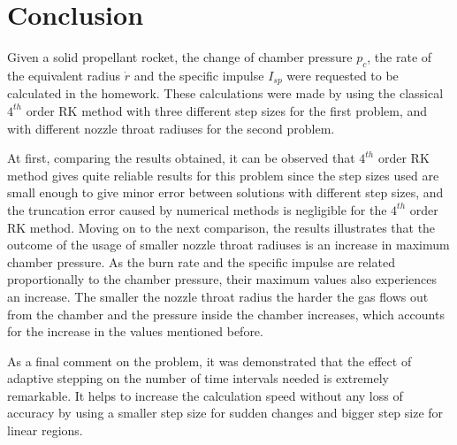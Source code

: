 \documentclass[letterpaper,12pt]{article}
\begin{document}
\newpage

\section{Conclusion}

Given a solid propellant rocket, the change of chamber pressure $p_c$,
the rate of the equivalent radius $\dot{r}$ and the specific impulse $I_{sp}$ were
requested to be calculated in the homework. These calculations were
made by using the classical $4^{th}$ order RK method with three different step sizes for the first
problem, and with different nozzle throat radiuses for the second problem.

At first, comparing the results obtained, it can be observed that $4^{th}$ order RK method gives
quite reliable results for this problem since the step sizes used are small
enough to give minor error between solutions with different step sizes, and the truncation error 
caused by numerical methods is negligible for the $4^{th}$ order RK method. Moving on to the 
next comparison, the results illustrates that the outcome of the usage of smaller nozzle throat 
radiuses is an increase in maximum chamber pressure. As the burn rate and the specific impulse
are related proportionally to the chamber pressure, their maximum values also experiences
an increase. The smaller the nozzle throat radius the harder the gas flows out from the chamber and
the pressure inside the chamber increases, which accounts for the increase in the values
mentioned before.

As a final comment on the problem, it was demonstrated that the effect of adaptive stepping
on the number of time intervals needed is extremely remarkable. It helps to increase
the calculation speed without any loss of accuracy by using a smaller step size for
sudden changes and bigger step size for linear regions.
\end{document}
